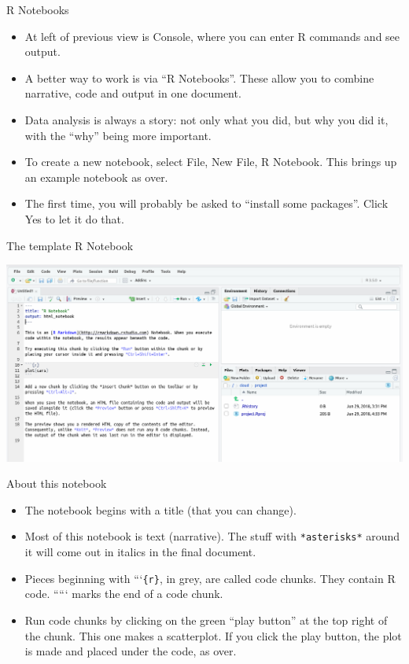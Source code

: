 \documentclass[
  ignorenonframetext,
]{beamer}
\providecommand{\tightlist}{%
  \setlength{\itemsep}{0pt}\setlength{\parskip}{0pt}}
\begin{document}
\begin{frame}{R Notebooks}
\protect\hypertarget{r-notebooks}{}

\begin{itemize}
\tightlist
\item
  At left of previous view is Console, where you can enter R commands
  and see output.
\item
  A better way to work is via ``R Notebooks''. These allow you to
  combine narrative, code and output in one document.
\item
  Data analysis is always a story: not only what you did, but why you
  did it, with the ``why'' being more important.
\item
  To create a new notebook, select File, New File, R Notebook. This
  brings up an example notebook as over.
\item
  The first time, you will probably be asked to ``install some
  packages''. Click Yes to let it do that.
\end{itemize}

\end{frame}

\begin{frame}{The template R Notebook}
\protect\hypertarget{the-template-r-notebook}{}

\includegraphics{Screenshot_2018-06-29_16-40-36.png}

\end{frame}

\begin{frame}[fragile]{About this notebook}
\protect\hypertarget{about-this-notebook}{}

\begin{itemize}
\tightlist
\item
  The notebook begins with a title (that you can change).
\item
  Most of this notebook is text (narrative). The stuff with
  \texttt{*asterisks*} around it will come out in italics in the final
  document.
\item
  Pieces beginning with ```\texttt{\{r\}}, in grey, are called code
  chunks. They contain R code. ````` marks the end of a code chunk.
\item
  Run code chunks by clicking on the green ``play button'' at the top
  right of the chunk. This one makes a scatterplot. If you click the
  play button, the plot is made and placed under the code, as over.
\end{itemize}

\end{frame}
\end{document}
